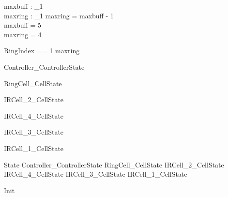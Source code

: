 \documentclass{article}
\begin{document}

\begin{axdef}
	maxbuff : \nat_1 \\
 maxring : \nat_1 
\where
 maxring = maxbuff - 1 \\
 maxbuff = 5 \\
 maxring = 4
\end{axdef}

\begin{zed}
	RingIndex == 1 \upto maxring
\end{zed}

\begin{zed}
	Controller\_ControllerState 
\end{zed}

\begin{zed}
	RingCell\_CellState 
\end{zed}

\begin{zed}
	IRCell\_2\_CellState 
\end{zed}

\begin{zed}
	IRCell\_4\_CellState 
\end{zed}

\begin{zed}
	IRCell\_3\_CellState 
\end{zed}

\begin{zed}
	IRCell\_1\_CellState 
\end{zed}

\begin{zed}
	State  Controller\_ControllerState \land RingCell\_CellState \land IRCell\_2\_CellState \land IRCell\_4\_CellState \land IRCell\_3\_CellState \land IRCell\_1\_CellState
\end{zed}

\begin{zed}
	Init 
\end{zed}
\end{document}
